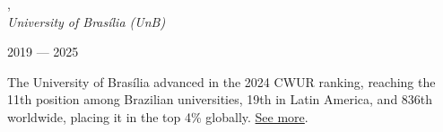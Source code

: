 , \\  
\textit{University of Brasília (UnB)}\strut \hfill 2019 --- 2025\\  

\vspace*{7pt}  

The University of Brasília advanced in the 2024 CWUR ranking, reaching the 11th position among Brazilian universities, 
19th in Latin America, and 836th worldwide, placing it in the top 4\% globally. \href{https://cwur.org/2024/university-of-brasilia.php}{See more}.


